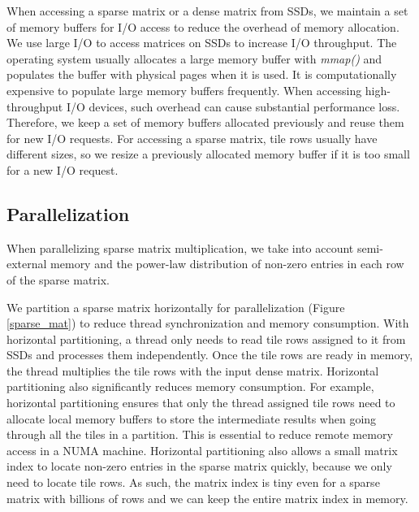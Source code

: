 When accessing a sparse matrix or a dense matrix from SSDs, we maintain a set of
memory buffers for I/O access to reduce the overhead of memory allocation.
We use large I/O to access matrices on SSDs to increase I/O throughput.
The operating system usually allocates a large memory buffer with \textit{mmap()}
and populates the buffer with physical pages when it is used. It is
computationally expensive to populate
large memory buffers frequently. When accessing high-throughput I/O devices,
such overhead can cause substantial performance loss. Therefore, we keep a set
of memory buffers allocated previously and reuse them for new I/O requests.
For accessing a sparse matrix, tile rows usually have different sizes, so we resize
a previously allocated memory buffer if it is too small for a new I/O request.

\subsection{Parallelization}
When parallelizing sparse matrix multiplication, we take into account
semi-external memory and the power-law distribution of non-zero entries
in each row of the sparse matrix.

We partition a sparse matrix horizontally for parallelization (Figure
\ref{sparse_mat}) to reduce thread synchronization and memory consumption.
With horizontal partitioning, a thread only needs to read tile rows assigned
to it from SSDs and processes them independently. Once the tile rows
are ready in memory, the thread multiplies the tile rows with the input
dense matrix. Horizontal partitioning also significantly reduces memory
consumption.
For example, horizontal partitioning ensures that only the thread assigned tile
rows need to allocate local memory buffers to store the intermediate results
when going through all the tiles in a partition. This is essential to reduce
remote memory access in a NUMA
machine. Horizontal partitioning also allows a small matrix index to
locate non-zero entries in the sparse matrix quickly, because we only need to
locate tile rows. As such,
the matrix index is tiny even for a sparse matrix with billions of rows
and we can keep the entire matrix index in memory.

